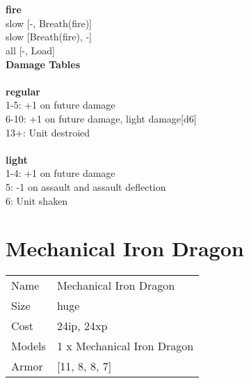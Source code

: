  
\ \\



\ \\ {\bf fire } \\
slow [-, Breath(fire)] \\
slow [Breath(fire), -] \\
all [-, Load] \\


{\bf Damage Tables} \\
\ \\ {\bf regular } \\
1-5: +1 on future damage \\
6-10: +1 on future damage, light damage[d6] \\
13+: Unit destroied \\
\ \\ {\bf light } \\
1-4: +1 on future damage \\
5: -1 on assault and assault deflection \\
6: Unit shaken \\










\pagebreak\pagebreak

\section{ Mechanical Iron Dragon }

\begin{tabular}{ll}
  Name & Mechanical Iron Dragon \\
  Size & huge\\
  Cost & 24ip, 24xp\\
  Models & 1 x Mechanical Iron Dragon\\
  Armor & [11, 8, 8, 7]\\
\end{tabular}

\noindent 

